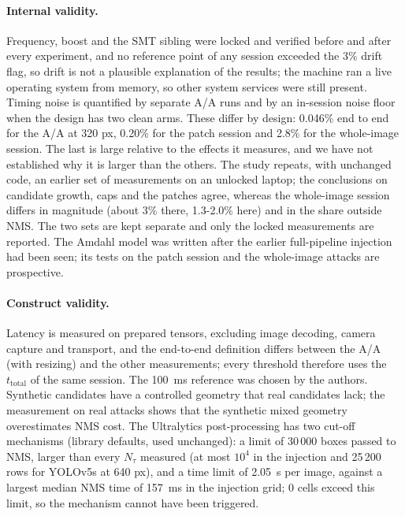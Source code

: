 \documentclass[a4paper,fleqn]{cas-dc}
\newcommand{\Ntau}{N_{\tau}}
\begin{document}
\paragraph{Internal validity.}
Frequency, boost and the SMT sibling were locked and verified before and after every experiment, and no reference point of any session exceeded the 3\% drift flag, so drift is not a plausible explanation of the results; the machine ran a live operating system from memory, so other system services were still present. Timing noise is quantified by separate A/A runs and by an in-session noise floor when the design has two clean arms. These differ by design: 0.046\% end to end for the A/A at 320 px, 0.20\% for the patch session and 2.8\% for the whole-image session. The last is large relative to the effects it measures, and we have not established why it is larger than the others. The study repeats, with unchanged code, an earlier set of measurements on an unlocked laptop; the conclusions on candidate growth, caps and the patches agree, whereas the whole-image session differs in magnitude (about 3\% there, 1.3-2.0\% here) and in the share outside NMS. The two sets are kept separate and only the locked measurements are reported. The Amdahl model was written after the earlier full-pipeline injection had been seen; its tests on the patch session and the whole-image attacks are prospective.
\paragraph{Construct validity.}
Latency is measured on prepared tensors, excluding image decoding, camera capture and transport, and the end-to-end definition differs between the A/A (with resizing) and the other measurements; every threshold therefore uses the $t_{\mathrm{total}}$ of the same session. The 100~ms reference was chosen by the authors. Synthetic candidates have a controlled geometry that real candidates lack; the measurement on real attacks shows that the synthetic mixed geometry overestimates NMS cost. The Ultralytics post-processing has two cut-off mechanisms (library defaults, used unchanged): a limit of 30\,000 boxes passed to NMS, larger than every $\Ntau$ measured (at most $10^4$ in the injection and 25\,200 rows for YOLOv5s at 640 px), and a time limit of 2.05~s per image, against a largest median NMS time of 157~ms in the injection grid; 0 cells exceed this limit, so the mechanism cannot have been triggered.
\end{document}
